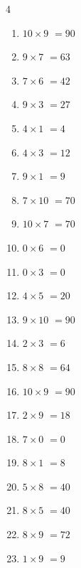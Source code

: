 \begin{multicols}{4}
\begin{enumerate}
  \item $10\times 9$
        $=90$

  \item $9\times 7$
        $=63$

  \item $7\times 6$
        $=42$

\columnbreak %

  \item $9\times 3$
        $=27$

  \item $4\times 1$
        $=4$

  \item $4\times 3$
        $=12$

  \item $9\times 1$
        $=9$

  \item $7\times 10$
        $=70$

  \item $10\times 7$
        $=70$

  \item $0\times 6$
        $=0$

  \item $0\times 3$
        $=0$

  \item $4\times 5$
        $=20$

  \item $9\times 10$
        $=90$

  \item $2\times 3$
        $=6$

  \item $8\times 8$
        $=64$

  \item $10\times 9$
        $=90$

  \item $2\times 9$
        $=18$

  \item $7\times 0$
        $=0$

  \item $8\times 1$
        $=8$

  \item $5\times 8$
        $=40$

  \item $8\times 5$
        $=40$

  \item $8\times 9$
        $=72$

  \item $1\times 9$
        $=9$


\end{enumerate}
\end{multicols}
